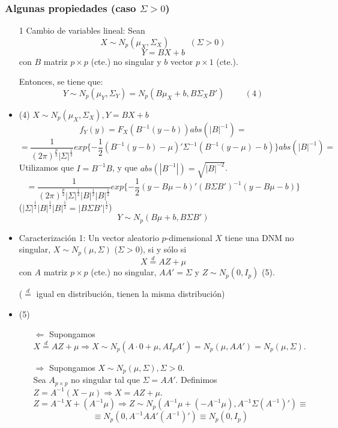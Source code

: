\documentclass[11pt,a4paper]{article}
\begin{document}
\subsubsection{Algunas propiedades (caso \texorpdfstring{$\Sigma > 0$}))}
\begin{itemize}
\item[1] Cambio de variables lineal: Sean
$$X \sim N_{p}(\mu_{X}, \Sigma_{X}) \hspace{1cm} (\Sigma > 0)$$
$$Y = BX + b$$
con $B$ matriz $p \times p$ (cte.) no singular y $b$ vector $p \times 1$ (cte.).

Entonces, se tiene que:
$$Y \sim N_{p}(\mu_{Y}, \Sigma_{Y}) = N_{p}(B \mu_{X} + b, B\Sigma_{X}B') \hspace{1cm} (4)$$

\item (4) $X \sim N_{p}(\mu_{X}, \Sigma_{X}),  Y = BX + b$
$$f_{Y}(y) = F_{X}(B^{-1}(y-b)) abs(|B|^{-1}) =$$
$$= \frac{1}{(2\pi)^{\frac{p}{2}}|\Sigma|^{\frac{1}{2}}} exp\{-\frac{1}{2} (B^{-1}(y-b) - \mu)' \Sigma^{-1} (B^{-1}(y-\mu) - b)\} abs(|B|^{-1}) =$$
Utilizamos que $I = B^{-1}B$, y que $abs(|B^{-1}|) = \sqrt{|B|^{-2}}$.
$$= \frac{1}{(2\pi)^{\frac{p}{2}} |\Sigma|^{\frac{1}{2}} |B|^{\frac{1}{2}} |B|^{\frac{1}{2}}} exp\{-\frac{1}{2} (y-B\mu-b)' (B \Sigma B')^{-1} (y-B\mu-b)\}$$
($|\Sigma|^{\frac{1}{2}} |B|^{\frac{1}{2}} |B|^{\frac{1}{2}} = |B \Sigma B'|^{\frac{1}{2}}$)
$$Y \sim N_{p}(B\mu+b, B \Sigma B')$$

\item Caracterización 1: Un vector aleatorio $p$-dimensional $X$ tiene una DNM no singular, $X \sim N_{p}(\mu, \Sigma)$ ($\Sigma > 0$), si y sólo si
$$X \overset{d}{=} AZ + \mu$$
con $A$ matriz $p \times p$ (cte.) no singular, $AA' = \Sigma$ y $Z \sim N_{p}(0, I_{p})$ (5).

($\overset{d}{=}$ igual en distribución, tienen la misma distribución)

\item (5)
\begin{itemize}
\item[$\Leftarrow$] Supongamos $X \overset{d}{=} AZ + \mu \Rightarrow X \sim N_{p}(A \cdot 0 + \mu, A I_{p} A') = N_{p}(\mu, AA') = N_{p}(\mu, \Sigma)$.
\item[$\Rightarrow$] Supongamos $X \sim N_{p}(\mu, \Sigma), \Sigma > 0$. \\
Sea $A_{p \times p}$ no singular tal que $\Sigma = AA'$. Definimos $Z = A^{-1}(X - \mu) \Rightarrow X = AZ + \mu$.
$$Z = A^{-1}X + (A^{-1}\mu) \Rightarrow Z \sim N_{p} (A^{-1} \mu + (-A^{-1}\mu), A^{-1}\Sigma(A^{-1})') \equiv$$
$$\equiv N_{p} (0, A^{-1}AA'(A^{-1})') \equiv N_{p}(0, I_{p})$$
\end{itemize}


\end{itemize}
\end{document}
